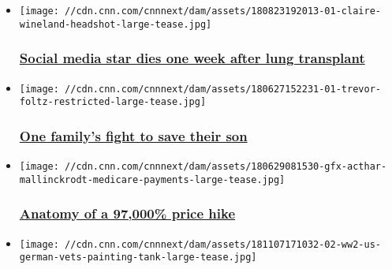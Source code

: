 \begin{itemize}
\item
  \href{/2018/09/03/health/claire-wineland-obit/index.html}{}

  \texttt{[image: //cdn.cnn.com/cnnnext/dam/assets/180823192013-01-claire-wineland-headshot-large-tease.jpg]}

  \hypertarget{social-media-star-dies-one-week-after-lung-transplant}{%
  \subsubsection{\texorpdfstring{\href{/2018/09/03/health/claire-wineland-obit/index.html}{Social
  media star dies one week after lung
  transplant}}{Social media star dies one week after lung transplant}}\label{social-media-star-dies-one-week-after-lung-transplant}}
\item
  \href{/2018/06/29/health/acthar-mallinckrodt-questcor-price-hike-trevor-foltz/index.html}{}

  \texttt{[image: //cdn.cnn.com/cnnnext/dam/assets/180627152231-01-trevor-foltz-restricted-large-tease.jpg]}

  \hypertarget{one-familys-fight-to-save-their-son}{%
  \subsubsection{\texorpdfstring{\href{/2018/06/29/health/acthar-mallinckrodt-questcor-price-hike-trevor-foltz/index.html}{One
  family's fight to save their
  son}}{One family's fight to save their son}}\label{one-familys-fight-to-save-their-son}}
\item
  \href{/2018/06/29/health/acthar-mallinckrodt-medicare-claims-doctor-payments/index.html}{}

  \texttt{[image: //cdn.cnn.com/cnnnext/dam/assets/180629081530-gfx-acthar-mallinckrodt-medicare-payments-large-tease.jpg]}

  \hypertarget{anatomy-of-a-97000-price-hike}{%
  \subsubsection{\texorpdfstring{\href{/2018/06/29/health/acthar-mallinckrodt-medicare-claims-doctor-payments/index.html}{Anatomy
  of a 97,000\% price
  hike}}{Anatomy of a 97,000\% price hike}}\label{anatomy-of-a-97000-price-hike}}
\item
  \href{/2018/11/10/us/ww2-reunion-us-german-veterans/index.html}{}

  \texttt{[image: //cdn.cnn.com/cnnnext/dam/assets/181107171032-02-ww2-us-german-vets-painting-tank-large-tease.jpg]}


\end{itemize}
